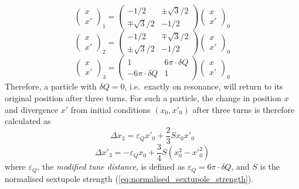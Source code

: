 \documentclass[11pt]{report}
\begin{document}
\begin{equation}
  \begin{pmatrix}
    x\\x'
  \end{pmatrix}_1=
  \begin{pmatrix}
    -1/2 & \pm\sqrt{3}/2 \\
    \mp\sqrt{3}/2 & -1/2
  \end{pmatrix}\begin{pmatrix}
    x\\x'
  \end{pmatrix}_0
\end{equation}
\begin{equation}
  \begin{pmatrix}
    x\\x'
  \end{pmatrix}_2=
  \begin{pmatrix}
    -1/2 & \mp\sqrt{3}/2 \\
    \pm\sqrt{3}/2 & -1/2
  \end{pmatrix}\begin{pmatrix}
    x\\x'
  \end{pmatrix}_0
\end{equation}
\begin{equation}
  \begin{pmatrix}
    x\\x'
  \end{pmatrix}_3=
  \begin{pmatrix}
    1 & 6\pi\cdot\delta Q \\
    -6\pi\cdot\delta Q & 1
  \end{pmatrix}\begin{pmatrix}
    x\\x'
  \end{pmatrix}_0
\end{equation}
Therefore, a particle with $\delta Q=0$, i.e.\ exactly on resonance, will return to its original position after three turns. For such a particle, the change in position $x$ and divergence $x'$ from initial conditions $(x_0, x'_0)$ after three turns is therefore calculated as
\begin{equation}
  \Delta x_3 = {\varepsilon_Q} x'_0 + \frac 23 S x_0x'_0
  \label{eq:spiral_step}
\end{equation}
\begin{equation}
  \Delta x'_3 = -{\varepsilon_Q} x_0 + \frac 34 S (x_0^2-x'^2_0)
  \label{eq:spiral_kick}
\end{equation}
where ${\varepsilon_Q}$, the \textit{modified tune distance}, is defined as ${\varepsilon_Q} = 6\pi\cdot\delta Q$, and $S$ is the normalised sextupole strength (\autoref{eq:normalised_sextupole_strength}).
\end{document}
